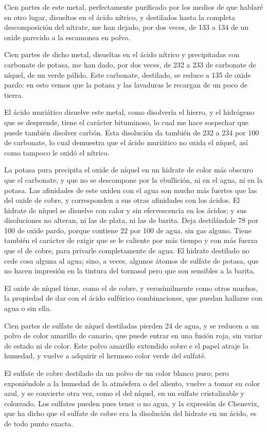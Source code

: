 \documentclass[a4paper, 12pt, oneside, spanish]{article}
\begin{document}
Cien partes de este metal, perfectamente purificado por los medios de que hablaré en otro lugar, disueltos en el ácido nítrico, y destilados hasta la completa descomposición del nítrate, me han dejado, por dos veces, de 133 a 134 de un oxide parecido a la escamonea en polvo.

Cien partes de dicho metal, disueltas en el ácido nítrico y precipitadas con carbonate de potasa, me han dado, por dos veces, de 232 a 233 de carbonate de níquel, de un verde pálido. Este carbonate, destilado, se reduce a 135 de oxide pardo: en esto vemos que la potasa y las lavaduras le recargan de un poco de tierra.

El ácido muriático disuelve este metal, como disolvería el hierro, y el hidrógeno que se desprende, tiene el carácter bituminoso, lo cual me hace sospechar que puede también disolver carbón. Esta disolución da también de 232 a 234 por 100 de carbonate, lo cual demuestra que el ácido muriático no oxida el níquel, así como tampoco le oxidó el nítrico.

La potasa pura precipita el oxide de níquel en un hidrate de color más obscuro que el carbonate, y que no se descompone por la ebullición, ni en el agua, ni en la potasa. Las afinidades de este oxiden con el agua son mucho más fuertes que las del oxide de cobre, y corresponden a sus otras afinidades con los ácidos. El hidrate de níquel se disuelve con calor y sin efervescencia en los ácidos; y sus disoluciones no alteran, ni las de plata, ni las de barita. Deja destilándole 78 por 100 de oxide pardo, porque contiene 22 por 100 de agua, sin gas alguno. Tiene también el carácter de exigir que se le caliente por más tiempo y con más fuerza que el de cobre, para privarle completamente de agua. El hidrate destilado no cede cosa alguna al agua; sino, a veces, algunos átomos de sulfate de potasa, que no hacen impresión en la tintura del tornasol pero que son sensibles a la barita.

El oxide de níquel tiene, como el de cobre, y verosímilmente como otros muchos, la propiedad de dar con el ácido sulfúrico combinaciones, que puedan hallarse con agua o sin ella.

Cien partes de sulfate de níquel destiladas pierden 24 de agua, y se reducen a un polvo de color amarillo de canario, que puede entrar en una fusión roja, sin variar de estado ni de color. Este polvo amarillo extendido sobre e el papel atraje la humedad, y vuelve a adquirir el hermoso color verde del sulfaté.

El sulfate de cobre destilado da un polvo de un color blanco puro; pero exponiéndole a la humedad de la atmósfera o del aliento, vuelve a tomar su color azul, y se convierte otra vez, como el del níquel, en un sulfate cristalizable y coloreado. Los sulfates pueden pues tener o no agua, y la expresión de Chenevix, que ha dicho que el sulfate de cobre era la disolución del hidrate en un ácido, es de todo punto exacta.
\end{document}
